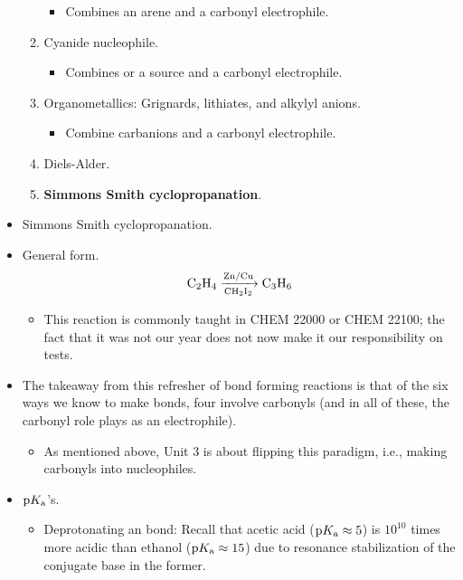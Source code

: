 \documentclass[../notes.tex]{subfiles}
\begin{document}
\begin{itemize}
\begin{enumerate}
\begin{itemize}
            \item Combines an arene and a carbonyl electrophile.
        \end{itemize}
        \item Cyanide nucleophile.
        \begin{itemize}
            \item Combines  or a  source and a carbonyl electrophile.
        \end{itemize}
        \item Organometallics: Grignards, lithiates, and alkylyl anions.
        \begin{itemize}
            \item Combine carbanions and a carbonyl electrophile.
        \end{itemize}
        \item Diels-Alder.
        \item \textbf{Simmons Smith cyclopropanation}.
    \end{enumerate}
    \item Simmons Smith cyclopropanation.
    \item General form.
    \begin{equation*}
        \ce{C2H4 ->[Zn/Cu][CH2I2] C3H6}
    \end{equation*}
    \begin{itemize}
        \item This reaction is commonly taught in CHEM 22000 or CHEM 22100; the fact that it was not our year does not now make it our responsibility on tests.
    \end{itemize}
    \item The takeaway from this refresher of  bond forming reactions is that of the six ways we know to make  bonds, four involve carbonyls (and in all of these, the carbonyl role plays as an electrophile).
    \begin{itemize}
        \item As mentioned above, Unit 3 is about flipping this paradigm, i.e., making carbonyls into nucleophiles.
    \end{itemize}
    \item $\text{p}K_\text{a}$'s.
    \begin{itemize}
        \item Deprotonating an  bond: Recall that acetic acid ($\text{p}K_\text{a}\approx 5$) is $10^{10}$ times more acidic than ethanol ($\text{p}K_\text{a}\approx 15$) due to resonance stabilization of the conjugate base in the former.

\end{itemize}
\end{itemize}
\end{document}
